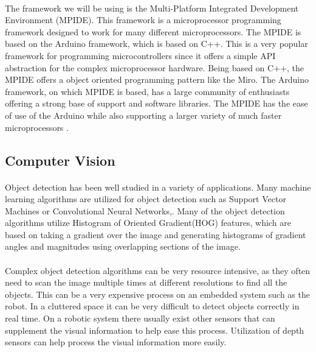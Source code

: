 \documentclass[titlepage,letterpaper,12pt]{article}
\begin{document}
\paragraph{}The framework we will be using is the Multi-Platform Integrated
Development Environment (MPIDE). This framework is a microprocessor programming
framework designed to work for many different microprocessors. The MPIDE is
based on the Arduino framework, which is based on C++. This is a very popular
framework for programming microcontrollers since it offers a simple API
abstraction for the complex microprocessor hardware. Being based on C++, the
MPIDE offers a object oriented programming pattern like the Miro. The Arduino
framework, on which MPIDE is based, has a large community of enthusiasts
offering a strong base of support and software libraries. The MPIDE has the ease
of use of the Arduino while also supporting a larger variety of much faster
microprocessors \cite{anderson2013using}.

\subsection{Computer Vision}
\paragraph{}Object detection has been well studied in a variety of applications.
Many machine learning algorithms are utilized for object detection such as
Support Vector Machines or Convolutional Neural
Networks\cite{Barbu2012},\cite{krizhevsky2012imagenet}. Many of the object
detection algorithms utilize Histogram of Oriented Gradient(HOG) features, which
are based on taking a gradient over the image and generating histograms of
gradient angles and magnitudes using overlapping sections of the
image\cite{Dalal2005}. 

\paragraph{}Complex object detection algorithms can be very resource intensive,
as they often need to scan the image multiple times at different resolutions to
find all the objects\cite{Felzenszwalb2013}. This can be a very expensive
process on an embedded system such as the robot. In a cluttered space it can be
very difficult to detect objects correctly in real time. On a robotic system
there usually exist other sensors that can supplement the visual information to
help ease this process. Utilization of depth sensors can help process the visual
information more easily\cite{Gould2008}.
\end{document}
